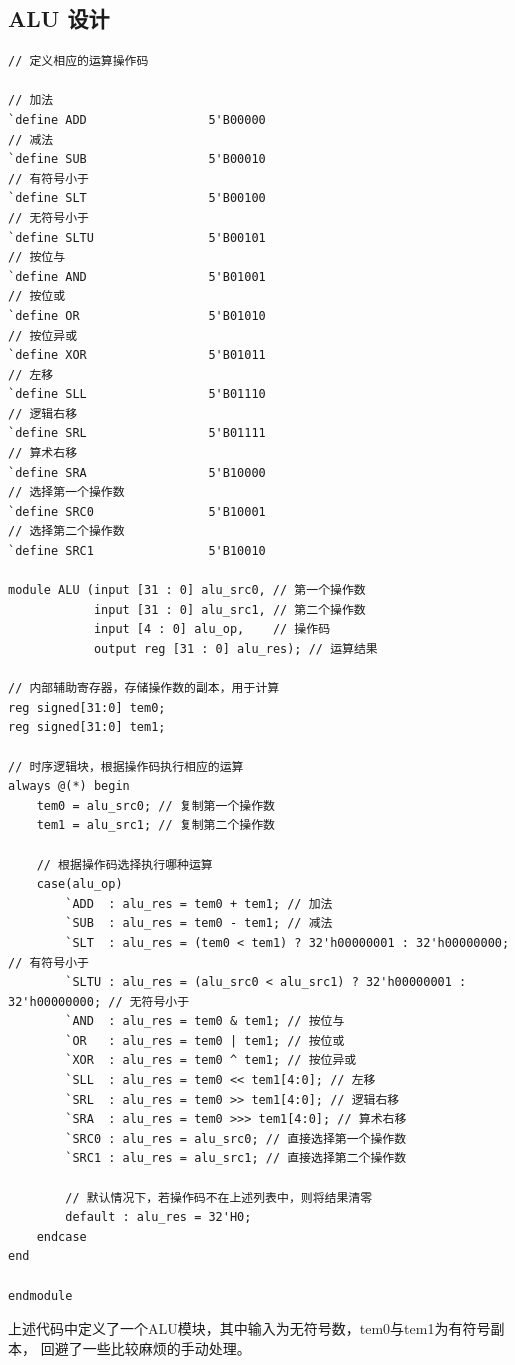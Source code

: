 \documentclass[12pt,a4paper]{ctexart}
\begin{document}
\subsection{ALU 设计}
\begin{lstlisting}[style=verilog]
// 定义相应的运算操作码

// 加法
`define ADD                 5'B00000
// 减法
`define SUB                 5'B00010
// 有符号小于
`define SLT                 5'B00100
// 无符号小于
`define SLTU                5'B00101
// 按位与
`define AND                 5'B01001
// 按位或
`define OR                  5'B01010
// 按位异或
`define XOR                 5'B01011
// 左移
`define SLL                 5'B01110
// 逻辑右移
`define SRL                 5'B01111
// 算术右移
`define SRA                 5'B10000
// 选择第一个操作数
`define SRC0                5'B10001
// 选择第二个操作数
`define SRC1                5'B10010

module ALU (input [31 : 0] alu_src0, // 第一个操作数
            input [31 : 0] alu_src1, // 第二个操作数
            input [4 : 0] alu_op,    // 操作码
            output reg [31 : 0] alu_res); // 运算结果

// 内部辅助寄存器，存储操作数的副本，用于计算
reg signed[31:0] tem0;
reg signed[31:0] tem1;

// 时序逻辑块，根据操作码执行相应的运算
always @(*) begin
    tem0 = alu_src0; // 复制第一个操作数
    tem1 = alu_src1; // 复制第二个操作数

    // 根据操作码选择执行哪种运算
    case(alu_op)
        `ADD  : alu_res = tem0 + tem1; // 加法
        `SUB  : alu_res = tem0 - tem1; // 减法
        `SLT  : alu_res = (tem0 < tem1) ? 32'h00000001 : 32'h00000000; // 有符号小于
        `SLTU : alu_res = (alu_src0 < alu_src1) ? 32'h00000001 : 32'h00000000; // 无符号小于
        `AND  : alu_res = tem0 & tem1; // 按位与
        `OR   : alu_res = tem0 | tem1; // 按位或
        `XOR  : alu_res = tem0 ^ tem1; // 按位异或
        `SLL  : alu_res = tem0 << tem1[4:0]; // 左移
        `SRL  : alu_res = tem0 >> tem1[4:0]; // 逻辑右移
        `SRA  : alu_res = tem0 >>> tem1[4:0]; // 算术右移
        `SRC0 : alu_res = alu_src0; // 直接选择第一个操作数
        `SRC1 : alu_res = alu_src1; // 直接选择第二个操作数
        
        // 默认情况下，若操作码不在上述列表中，则将结果清零
        default : alu_res = 32'H0;
    endcase
end

endmodule

\end{lstlisting}
上述代码中定义了一个ALU模块，其中输入为无符号数，tem0与tem1为有符号副本，
回避了一些比较麻烦的手动处理。
\end{document}
